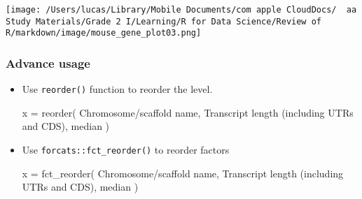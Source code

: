 \documentclass[
]{article}
\let\oldincludegraphics\includegraphics
\renewcommand{\includegraphics}[2][]{\begin{center}\oldincludegraphics[#1]{#2}\end{center}}
\newenvironment{Shaded}{}{}
\newcommand{\AttributeTok}[1]{\textcolor[rgb]{0.49,0.56,0.16}{#1}}
\newcommand{\FunctionTok}[1]{\textcolor[rgb]{0.02,0.16,0.49}{#1}}
\newcommand{\NormalTok}[1]{#1}
\newcommand{\OtherTok}[1]{\textcolor[rgb]{0.00,0.44,0.13}{#1}}
\newcommand{\StringTok}[1]{\textcolor[rgb]{0.25,0.44,0.63}{#1}}
\begin{document}
\texttt{[image: /Users/lucas/Library/Mobile Documents/com~apple~CloudDocs/~~aa Study Materials/Grade 2 I/Learning/R for Data Science/Review of R/markdown/image/mouse\_gene\_plot03.png]}

\hypertarget{advance-usage}{%
\subsubsection{Advance usage}\label{advance-usage}}

\begin{itemize}
\item
  Use \texttt{reorder()} function to reorder the level.

\begin{Shaded}
\begin{Highlighting}[]
\NormalTok{x }\OtherTok{=} \FunctionTok{reorder}\NormalTok{( }
  \StringTok{\textasciigrave{}}\AttributeTok{Chromosome/scaffold name}\StringTok{\textasciigrave{}}\NormalTok{,}
  \StringTok{\textasciigrave{}}\AttributeTok{Transcript length (including UTRs and CDS)}\StringTok{\textasciigrave{}}\NormalTok{,}
\NormalTok{  median}
\NormalTok{)}
\end{Highlighting}
\end{Shaded}
\end{itemize}

\begin{itemize}
\item
  Use \texttt{forcats::fct\_reorder()} to reorder factors

\begin{Shaded}
\begin{Highlighting}[]
\NormalTok{x }\OtherTok{=} \FunctionTok{fct\_reorder}\NormalTok{( }
  \StringTok{\textasciigrave{}}\AttributeTok{Chromosome/scaffold name}\StringTok{\textasciigrave{}}\NormalTok{,}
  \StringTok{\textasciigrave{}}\AttributeTok{Transcript length (including UTRs and CDS)}\StringTok{\textasciigrave{}}\NormalTok{,}
\NormalTok{  median }
\NormalTok{)}
\end{Highlighting}
\end{Shaded}
\end{itemize}
\end{document}
